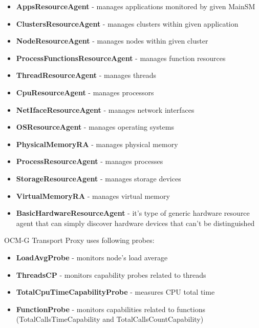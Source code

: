 \begin{itemize} 
  \item{\bf{AppsResourceAgent}} - manages applications monitored by given MainSM
  \item{\bf{ClustersResourceAgent}} - manages clusters within given application
  \item{\bf{NodeResourceAgent}} - manages nodes within given cluster
  \item{\bf{ProcessFunctionsResourceAgent}} - manages function resources
  \item{\bf{ThreadResourceAgent}} - manages threads
  \item{\bf{CpuResourceAgent}} - manages processors
  \item{\bf{NetIfaceResourceAgent}} - manages network interfaces
  \item{\bf{OSResourceAgent}} - manages operating systems
  \item{\bf{PhysicalMemoryRA}} - manages physical memory
  \item{\bf{ProcessResourceAgent}} - manages processes
  \item{\bf{StorageResourceAgent}} - manages storage devices
  \item{\bf{VirtualMemoryRA}} - manages virtual memory
  \item{\bf{BasicHardwareResourceAgent}} - it\rq{}s type of generic hardware resource agent that can simply discover hardware devices that can\rq{}t be distinguished
\end{itemize} 
  
OCM-G Transport Proxy uses following probes:

\begin{itemize} 
  \item{\bf{LoadAvgProbe}} - monitors node\rq{}s load average 
  \item{\bf{ThreadsCP}} - monitors capability probes related to threads
  \item{\bf{TotalCpuTimeCapabilityProbe}} - measures CPU total time
  \item{\bf{FunctionProbe}} - monitors capabilities related to functions (TotalCallsTimeCapability and TotalCallsCountCapability)
\end{itemize} 


